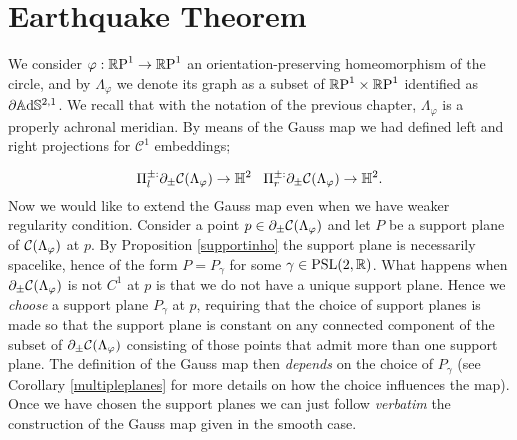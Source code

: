 

\section{Earthquake Theorem}\label{quakesection}
We consider $\varphi:\S\to\S$ an orientation-preserving homeomorphism of the circle, and by $\Lambda_\varphi$ we denote its graph as a subset of $\T$ identified as $\partial\A^{2,1}$. We recall that with the notation of the previous chapter, $\Lambda_\varphi$ is a properly achronal meridian. By means of the Gauss map we had defined left and right projections for $\mathcal{C}^1$ embeddings; 

\[
    \Pi_l^{\pm:}\partial_\pm\CF\to\H^2 \;\;\; \Pi_r^{\pm:}\partial_\pm\CF\to\H^2.
\]
Now we would like to extend the Gauss map even when we have weaker regularity condition. Consider a point $p \in \partial_\pm\CF$ and let $P$ be a support plane of $\CF$ at $p$. By Proposition \ref{supportinho} the support plane is necessarily spacelike, hence of the form $P=P_\gamma$ for some $\gamma\in\PSL$. What happens when $\partial_\pm\CF$ is not $C^1$ at $p$ is that we do not have a unique support plane. Hence we \textit{choose} a support plane $P_\gamma$ at $p$, requiring that the choice of support planes is made so that the support plane is constant on any connected component of the subset of $\partial_\pm\CF$ consisting of those points that admit more than one support plane. The definition of the Gauss map then \textit{depends} on the choice of $P_\gamma$ (see Corollary \ref{multipleplanes} for more details on how the choice influences the map). Once we have chosen the support planes we can just follow \textit{verbatim} the construction of the Gauss map given in the smooth case.

